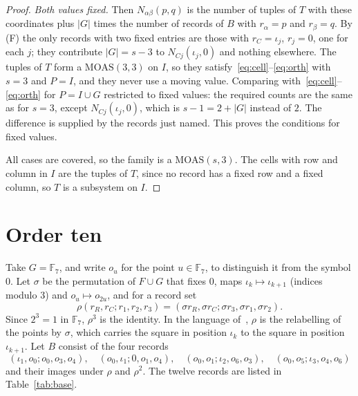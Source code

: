 \documentclass[11pt]{amsart}
\theoremstyle{definition}\newtheorem{definition}[theorem]{Definition}
\theoremstyle{remark}\newtheorem{remark}[theorem]{Remark}
\newcommand{\MOAS}{\mathrm{MOAS}}
\begin{document}
\begin{proof}
\emph{Both values fixed.} Then $N_{\alpha\beta}(p,q)$ is the number of tuples of $T$ with these coordinates plus $|G|$
times the number of records of $B$ with $r_\alpha=p$ and $r_\beta=q$. By (F) the only records with two fixed entries
are those with $r_C=\iota_j$, $r_j=0$, one for each $j$; they contribute $|G|=s-3$ to $N_{Cj}(\iota_j,0)$ and nothing
elsewhere. The tuples of $T$ form a $\MOAS(3,3)$ on $I$, so they satisfy~\eqref{eq:cell}--\eqref{eq:orth} with $s=3$
and $P=I$, and they never use a moving value. Comparing with~\eqref{eq:cell}--\eqref{eq:orth} for $P=I\cup G$ restricted
to fixed values: the required counts are the same as for $s=3$, except $N_{Cj}(\iota_j,0)$, which is $s-1=2+|G|$
instead of $2$. The difference is supplied by the records just named. This proves the conditions for fixed values.

All cases are covered, so the family is a $\MOAS(s,3)$. The cells with row and column in $I$ are the tuples of $T$,
since no record has a fixed row and a fixed column, so $T$ is a subsystem on $I$.
\end{proof}

\section{Order ten}\label{sec:ten}
Take $G=\mathbb F_7$, and write $o_u$ for the point $u\in\mathbb F_7$, to distinguish it from the symbol $0$. Let
$\sigma$ be the permutation of $F\cup G$ that fixes $0$, maps $\iota_k\mapsto\iota_{k+1}$ (indices modulo $3$) and
$o_u\mapsto o_{2u}$, and for a record set
\[
\rho(r_R,r_C;r_1,r_2,r_3)=(\sigma r_R,\sigma r_C;\sigma r_3,\sigma r_1,\sigma r_2).
\]
Since $2^3=1$ in $\mathbb F_7$, $\rho^3$ is the identity. In the language of~\cite[Lemma~2.19]{ABW}, $\rho$ is the
relabelling of the points by $\sigma$, which carries the square in position $\iota_k$ to the square in position
$\iota_{k+1}$. Let $B$ consist of the four records
\[
(\iota_1,o_0;o_0,o_3,o_4),\quad(o_0,\iota_1;0,o_1,o_4),\quad(o_0,o_1;\iota_2,o_6,o_3),\quad(o_0,o_5;\iota_3,o_4,o_6)
\]
and their images under $\rho$ and $\rho^2$. The twelve records are listed in Table~\ref{tab:base}.
\end{document}
